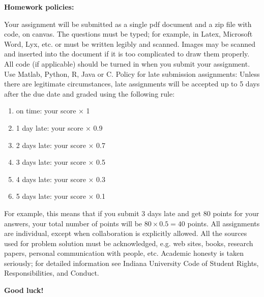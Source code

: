\documentclass[11pt]{article}
\begin{document}
\vspace{0.5cm}
\begin{center}
{\large \textbf{Homework policies:}}
\end{center}
Your assignment will be submitted as a single pdf document and a zip file with code, on canvas. 
The questions must be typed; for example, in Latex, Microsoft Word, Lyx, etc.
or must be written legibly and scanned.
Images may be scanned and inserted into the document if it is too complicated to draw them properly. 
%
All code (if applicable) should be turned in when you submit your assignment. 
Use Matlab, Python, R, Java or C.
Policy for late submission assignments: Unless there are legitimate circumstances, late assignments will be accepted up to 5 days after the due date and graded using the following rule: 
\begin{enumerate}
\itemsep0em 
\item[]    on time:	your score × 1
 \item[]   1 day late: 	your score × 0.9
\item[]    2 days late: 	your score × 0.7
\item[]    3 days late: 	your score × 0.5
 \item[]   4 days late: 	your score × 0.3
 \item[]   5 days late: 	your score × 0.1
\end{enumerate}
For example, this means that if you submit 3 days late and get 80 points for your answers, your total number of points will be $80 \times 0.5 = 40$ points.
All assignments are individual, except when collaboration is explicitly allowed. All the sources used for problem solution must be acknowledged, e.g. web sites, books, research papers, personal communication with people, etc. Academic honesty is taken seriously; for detailed information see Indiana University Code of Student Rights, Responsibilities, and Conduct.
\begin{center}
{\large \textbf{Good luck!}}
\end{center}

\label{EndOfAssignment}%
\end{document}
